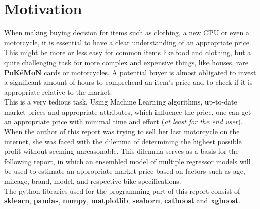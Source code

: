 \section{Motivation}
\label{sec:Motivation}

When making buying decision for items such as clothing, a new CPU or even a motorcycle, it is essential to have a clear understanding of
an appropriate price. This might be more or less easy for common items like food and clothing, but a quite challenging task for more complex and expensive things, like
houses, rare \textbf{PoKéMoN} cards or motorcycles. A potential buyer is almost obligated to invest a significant amount of hours to comprehend
an item's price and to check if it is appropriate relative to the market.\\
This is a very tedious task. Using Machine Learning algorithms, up-to-date market prices and appropriate attributes, which
influence the price, one can get an appropriate price with minimal time and effort (\textit{at least for the end user}).
When the author of this report was trying to sell her last motorcycle on the internet, she was faced with the dilemma of determining
the highest possible profit without seeming unreasonable. This dilemma serves as a basis for the following report, in which an ensembled model
of multiple regressor models will be used to estimate an appropriate market price based on factors such as age, mileage, brand, model, and 
respective bike specifications.\\
The python libraries used for the programming part of this report consist of \textbf{sklearn}\cite{sklearn}, \textbf{pandas}\cite{pandas}, \textbf{numpy}\cite{numpy},
\textbf{matplotlib}\cite{matplotlib}, \textbf{seaborn}\cite{seaborn}, \textbf{catboost}\cite{catboost} and \textbf{xgboost}\cite{XGBoost}.